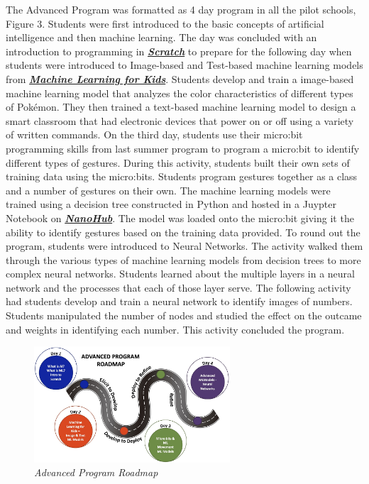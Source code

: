\documentclass[
]{article}
\begin{document}
The Advanced Program was formatted as 4 day program in all the pilot
schools, Figure 3. Students were first introduced to the basic concepts
of artificial intelligence and then machine learning. The day was
concluded with an introduction to programming in
\textbf{\emph{\href{https://scratch.mit.edu/}{Scratch}}} to prepare for
the following day when students were introduced to Image-based and
Test-based machine learning models from
\textbf{\emph{\href{https://machinelearningforkids.co.uk/}{Machine
Learning for Kids}}}. Students develop and train a image-based machine
learning model that analyzes the color characteristics of different
types of Pokémon. They then trained a text-based machine learning model
to design a smart classroom that had electronic devices that power on or
off using a variety of written commands. On the third day, students use
their micro:bit programming skills from last summer program to program a
micro:bit to identify different types of gestures. During this activity,
students built their own sets of training data using the micro:bits.
Students program gestures together as a class and a number of gestures
on their own. The machine learning models were trained using a decision
tree constructed in Python and hosted in a Juypter Notebook on
\textbf{\emph{\href{https://nanohub.org/}{NanoHub}}}. The model was
loaded onto the micro:bit giving it the ability to identify gestures
based on the training data provided. To round out the program, students
were introduced to Neural Networks. The activity walked them through the
various types of machine learning models from decision trees to more
complex neural networks. Students learned about the multiple layers in a
neural network and the processes that each of those layer serve. The
following activity had students develop and train a neural network to
identify images of numbers. Students manipulated the number of nodes and
studied the effect on the outcame and weights in identifying each
number. This activity concluded the program.

\begin{figure}
\centering
\includegraphics[width=0.65\textwidth,height=\textheight]{Images/GGEE_23_Adv_roadmap.jpg}
\caption{\emph{Advanced Program Roadmap}}
\end{figure}
\end{document}
